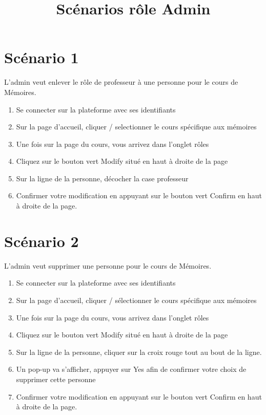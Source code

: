 \documentclass[a4paper, 11pt]{article}
\title{Scénarios rôle \bf Admin}
\author{}
\begin{document}
\maketitle

\section*{Scénario 1}
L'admin veut enlever le rôle de professeur à une personne pour le cours de Mémoires.

\begin{tcolorbox}
    \begin{enumerate}
        \item Se connecter sur la plateforme avec ses identifiants
        \item Sur la page d'accueil, cliquer / selectionner le cours spécifique aux mémoires
        \item Une fois sur la page du cours, vous arrivez dans l'onglet rôles
        \item Cliquez sur le bouton vert \og Modify\fg{} situé en haut à droite de la page
        \item Sur la ligne de la personne, décocher la case professeur 
        \item Confirmer votre modification en appuyant sur le bouton vert \og Confirm\fg{} en haut à droite de la page.
    \end{enumerate}
\end{tcolorbox}
\newpage
\section*{Scénario 2}
L'admin veut supprimer une personne pour le cours de Mémoires.

\begin{tcolorbox}
    \begin{enumerate}
        \item Se connecter sur la plateforme avec ses identifiants
        \item Sur la page d'accueil, cliquer / sélectionner le cours spécifique aux mémoires
        \item Une fois sur la page du cours, vous arrivez dans l'onglet rôles
        \item Cliquez sur le bouton vert \og Modify\fg{} situé en haut à droite de la page
        \item Sur la ligne de la personne, cliquer sur la croix rouge tout au bout de la ligne. 
        \item Un pop-up va s'afficher, appuyer sur \og Yes\fg{} afin de confirmer votre choix de supprimer cette personne
        \item Confirmer votre modification en appuyant sur le bouton vert \og Confirm\fg{} en haut à droite de la page.
    \end{enumerate}
\end{tcolorbox}
\end{document}
